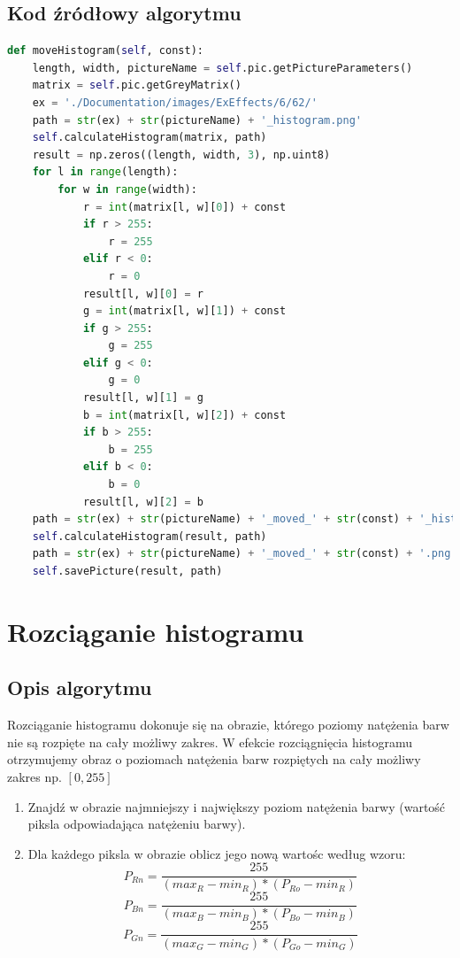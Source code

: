 \documentclass[a4paper,12pt, titlepage]{report}
\begin{document}
\subsection*{Kod źródłowy algorytmu}
\begin{lstlisting}[language=Python]
def moveHistogram(self, const):
    length, width, pictureName = self.pic.getPictureParameters()
    matrix = self.pic.getGreyMatrix()
    ex = './Documentation/images/ExEffects/6/62/'
    path = str(ex) + str(pictureName) + '_histogram.png'
    self.calculateHistogram(matrix, path)
    result = np.zeros((length, width, 3), np.uint8)
    for l in range(length):
        for w in range(width):
            r = int(matrix[l, w][0]) + const
            if r > 255:
                r = 255
            elif r < 0:
                r = 0
            result[l, w][0] = r
            g = int(matrix[l, w][1]) + const
            if g > 255:
                g = 255
            elif g < 0:
                g = 0
            result[l, w][1] = g
            b = int(matrix[l, w][2]) + const
            if b > 255:
                b = 255
            elif b < 0:
                b = 0
            result[l, w][2] = b
    path = str(ex) + str(pictureName) + '_moved_' + str(const) + '_histogram.png'
    self.calculateHistogram(result, path)
    path = str(ex) + str(pictureName) + '_moved_' + str(const) + '.png'
    self.savePicture(result, path)
\end{lstlisting}

\section{Rozciąganie histogramu}
\subsection*{Opis algorytmu}
\par Rozciąganie histogramu dokonuje się na obrazie, którego poziomy natężenia barw nie są rozpięte na cały możliwy zakres. W efekcie rozciągnięcia histogramu otrzymujemy obraz o poziomach natężenia barw rozpiętych na cały możliwy zakres np. \([0,255]\)
\begin{enumerate}
\item Znajdź w obrazie najmniejszy i największy poziom natężenia barwy (wartość piksla odpowiadająca natężeniu barwy).
\item Dla każdego piksla w obrazie oblicz jego nową wartośc według wzoru: \[P_{Rn}=\frac{255}{(max_{R}-min_{R})*(P_{Ro}-min_{R})}\]\[P_{Bn}=\frac{255}{(max_{B}-min_{B})*(P_{Bo}-min_{B})}\]\[P_{Gn}=\frac{255}{(max_{G}-min_{G})*(P_{Go}-min_{G})}\]
\end{enumerate}
\end{document}
